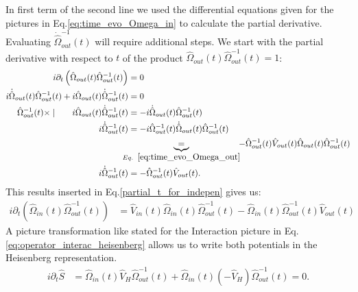 \documentclass[12pt, titlepage]{article}
\begin{document}
In first term of the second line we used the differential equations given for the pictures in  Eq.\enskip\eqref{eq:time_evo_Omega_in} to calculate the partial derivative. Evaluating $ \dot{\hat{\Omega}}^{-1}_{out}(t) $ will require additional steps. We start with the partial derivative with respect to $ t $ of the product $ 
\hat{\Omega}_{out}(t)\hat{\Omega}^{-1}_{out}(t)  = 1 $:
\begin{equation}
\begin{split}
i\partial_{t}
\left( \hat{\Omega}_{out}(t)\hat{\Omega}^{-1}_{out}(t) \right)
&=0
\\
 i\dot{\hat{\Omega}}_{out}(t)\hat{\Omega}^{-1}_{out}(t)
 	+ 
 		i\hat{\Omega}_{out}(t)\dot{\hat{\Omega}}^{-1}_{out}(t)
&=0 
\\
	\text{$  \hat{\Omega}^{-1}_{out}(t) \times \mid \qquad $}
		i\hat{\Omega}_{out}(t)\dot{\hat{\Omega}}^{-1}_{out}(t)
	&=
		-i\dot{\hat{\Omega}}_{out}(t)\hat{\Omega}^{-1}_{out}(t)
\\
		i\dot{\hat{\Omega}}^{-1}_{out}(t)
			&=	
			-i\hat{\Omega}^{-1}_{out}(t)\dot{\hat{\Omega}}_{out}(t)\hat{\Omega}^{-1}_{out}(t)
			\\
		&
		\!\!\!\!\!
		\underbrace{=}_{Eq.\enskip\eqref{eq:time_evo_Omega_out}}
				\!\!					
					-\hat{\Omega}_{out}^{-1}(t)\hat{V}_{out}(t)\hat{\Omega}_{out}(t)\hat{\Omega}^{-1}_{out}(t)
					\\
					i\dot{\hat{\Omega}}^{-1}_{out}(t)
			&=	
					-\hat{\Omega}^{-1}_{out}(t)\hat{V}_{out}(t)
.
\end{split}
\end{equation}
This results inserted in Eq.\enskip\eqref{partial_t_for_indepen} gives us:
\begin{equation}
\begin{split}
i\partial_{t}
\left( \hat{\Omega}_{in}(t)\hat{\Omega}^{-1}_{out}(t) \right)
&=  \hat{V}_{in}(t)\hat{\Omega}_{in}(t)\hat{\Omega}^{-1}_{out}(t)
	- 	
		\hat{\Omega}_{in}(t)\hat{\Omega}^{-1}_{out}(t)\hat{V}_{out}(t)
\end{split}
\end{equation}
A picture transformation like stated for the Interaction picture in Eq.\enskip\eqref{eq:operator_interac_heisenberg} allows us to write both potentials in the Heisenberg representation.
\begin{equation}\label{S_t_indep}
\begin{split}
i\partial_{t}
\hat{S}
&= \hat{\Omega}_{in}(t)\hat{V}_{H}\hat{\Omega}^{-1}_{out}(t)
+
\hat{\Omega}_{in}(t)(-\hat{V}_{H})\hat{\Omega}^{-1}_{out}(t) 
=0
.
\end{split}
\end{equation}
\end{document}
